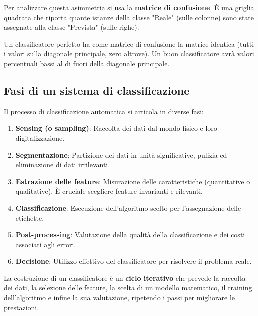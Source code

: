 Per analizzare questa asimmetria si usa la
\textbf{matrice di confusione}. È una griglia quadrata
che riporta quante istanze della classe "Reale" (sulle colonne)
sono state assegnate alla classe "Prevista" (sulle righe).

Un classificatore perfetto ha come matrice di confusione la
matrice identica (tutti i valori sulla diagonale principale,
zero altrove). Un buon classificatore avrà valori
percentuali bassi al di fuori della diagonale principale.

\subsection{Fasi di un sistema di classificazione}

Il processo di classificazione automatica si articola in
diverse fasi:
\begin{enumerate}
    \item \textbf{Sensing (o sampling)}: Raccolta dei dati dal
    mondo fisico e loro digitalizzazione.
    \item \textbf{Segmentazione}: Partizione dei dati in unità
    significative, pulizia ed eliminazione di dati irrilevanti.
    \item \textbf{Estrazione delle feature}: Misurazione delle
    caratteristiche (quantitative o qualitative). È cruciale
    scegliere feature invarianti e rilevanti.
    \item \textbf{Classificazione}: Esecuzione dell'algoritmo
    scelto per l'assegnazione delle etichette.
    \item \textbf{Post-processing}: Valutazione della qualità
    della classificazione e dei costi associati agli errori.
    \item \textbf{Decisione}: Utilizzo effettivo del
    classificatore per risolvere il problema reale.
\end{enumerate}

La costruzione di un classificatore è un \textbf{ciclo
iterativo} che prevede la raccolta dei dati, la selezione
delle feature, la scelta di un modello matematico, il
training dell'algoritmo e infine la sua valutazione,
ripetendo i passi per migliorare le prestazioni.
